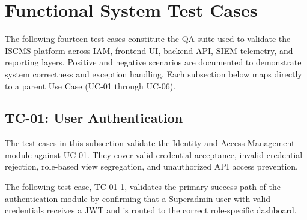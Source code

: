 \section{Functional System Test Cases}
The following fourteen test cases constitute the QA suite used to validate the ISCMS platform across IAM, frontend UI, backend API, SIEM telemetry, and reporting layers. Positive and negative scenarios are documented to demonstrate system correctness and exception handling. Each subsection below maps directly to a parent Use Case (UC-01 through UC-06).

\subsection{TC-01: User Authentication}
The test cases in this subsection validate the Identity and Access Management module against UC-01. They cover valid credential acceptance, invalid credential rejection, role-based view segregation, and unauthorized API access prevention.

The following test case, TC-01-1, validates the primary success path of the authentication module by confirming that a Superadmin user with valid credentials receives a JWT and is routed to the correct role-specific dashboard.

